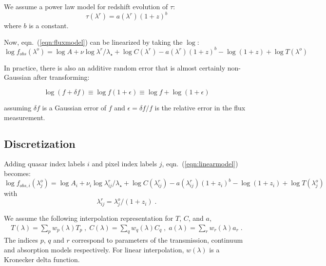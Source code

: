 \documentclass[oneside,10pt]{article}
\providecommand{\eqn}[1]{eqn.~(\ref{eqn:#1})}
\providecommand{\lambdaobs}{\lambda^o}
\providecommand{\lambdarest}{\lambda^r}
\begin{document}
We assume a power law model for redshift evolution of $\tau$:
\begin{equation}
\tau(\lambdarest) = a(\lambdarest) (1+z)^{b}
\end{equation}
where $b$ is a constant.

Now, \eqn{fluxmodel} can be linearized by taking the $\log$:
\begin{equation}
\log f_{obs}(\lambdaobs) = \log A + \nu \log \lambdarest/\lambda_\star + \log C(\lambdarest) - a(\lambdarest) (1+z)^{b} - \log (1+z) + \log T(\lambdaobs)
\label{eqn:linearmodel}
\end{equation}

In practice, there is also an additive random error that is almost certainly non-Gaussian after transforming:

\begin{equation}
\log (f + \delta f) \equiv \log f(1+\epsilon) \equiv \log f + \log (1+\epsilon) 
\end{equation}

assuming $\delta f$ is a Gaussian error of $f$ and $\epsilon = \delta f/f$ is the relative error in the flux measurement.

\subsection{Discretization}

Adding quasar index labels $i$ and pixel index labels $j$, \eqn{linearmodel} becomes:
\begin{equation}
\log f_{obs,i}(\lambdaobs_j) = \log A_i + \nu_i \log \lambdarest_{ij}/\lambda_\star + \log C(\lambdarest_{ij}) - a(\lambdarest_{ij}) (1+z_i)^{b} - \log (1+z_i) + \log T(\lambdaobs_j)
\end{equation}
with
\begin{equation}
\lambdarest_{ij} = \lambdaobs_j/(1+z_i) \; .
\end{equation}


We assume the following interpolation representation for $T$, $C$, and $a$,
\begin{gather}
T(\lambda) = \sum\limits_{p} w_p(\lambda) T_p \; , \;
C(\lambda) = \sum\limits_{q} w_q(\lambda) C_q  \; , \;
a(\lambda) = \sum\limits_{r} w_r(\lambda) a_r \; .
\end{gather}
The indices $p$, $q$ and $r$ correspond to parameters of the transmission, continuum and absorption models respectively. For linear interpolation, $w(\lambda)$ is a Kronecker delta function.
\end{document}
